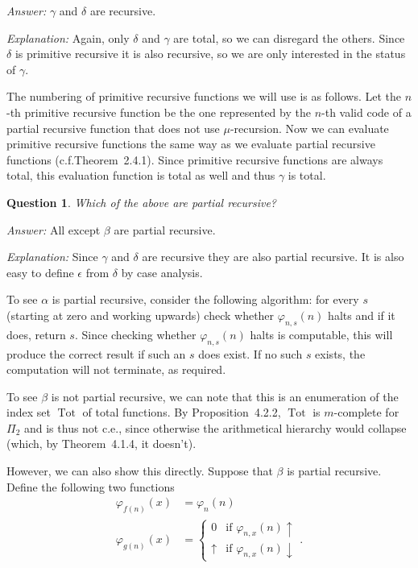 \documentclass{article}
\newtheorem{question}[theorem]{Question}
\newcommand{\terminates}{\!\!\downarrow}
\newcommand{\diverges}{\!\!\uparrow}
\DeclareMathOperator{\Tot}{Tot}
\begin{document}
  \noindent\emph{Answer:} $\gamma$ and $\delta$ are recursive.

  \noindent\emph{Explanation:} Again, only $\delta$ and $\gamma$ are total, so we can disregard the others.  Since $\delta$ is
  primitive recursive it is also recursive, so we are only interested in the status of $\gamma$.

  The numbering of primitive recursive functions we will use is as follows.  Let the $n$-th primitive recursive function
  be the one represented by the $n$-th valid code of a partial recursive function that does not use $\mu$-recursion.
  Now we can evaluate primitive recursive functions the same way as we evaluate partial recursive functions
  (c.f.\@ Theorem~2.4.1).  Since primitive recursive functions are always total, this evaluation function is total as
  well and thus $\gamma$ is total.

  \begin{question}
    Which of the above are partial recursive?
  \end{question}

  \noindent\emph{Answer:} All except $\beta$ are partial recursive.

  \noindent\emph{Explanation:} Since $\gamma$ and $\delta$ are recursive they are also partial recursive.  It is also easy to
  define $\epsilon$ from $\delta$ by case analysis.

  To see $\alpha$ is partial recursive, consider the following algorithm: for every $s$ (starting at zero and working
  upwards) check whether $\varphi_{n, s}(n)$ halts and if it does, return $s$.  Since checking whether $\varphi_{n,
  s}(n)$ halts is computable, this will produce the correct result if such an $s$ does exist.  If no such $s$ exists,
  the computation will not terminate, as required.

  To see $\beta$ is not partial recursive, we can note that this is an enumeration of the index set $\Tot$ of total
  functions.  By Proposition~4.2.2, $\Tot$ is $m$-complete for $\Pi_2$ and is thus not c.e., since otherwise the
  arithmetical hierarchy would collapse (which, by Theorem~4.1.4, it doesn't).

  However, we can also show this directly.  Suppose that $\beta$ is partial recursive.  Define the following two
  functions
  \begin{align*}
    \varphi_{f(n)}(x) &= \varphi_n(n)\\
    \varphi_{g(n)}(x) &=
    \begin{cases}
      0& \text{if $\varphi_{n,x}(n)\diverges$}\\
      \uparrow& \text{if $\varphi_{n,x}(n)\terminates$}
    \end{cases}.
  \end{align*}
\end{document}
